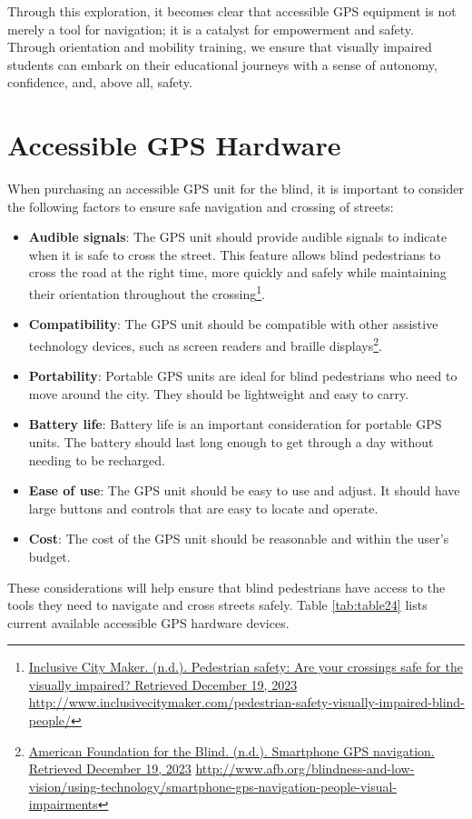 \documentclass[12pt,letterpaper,twoside,openright]{report}
\begin{document}
Through this exploration, it becomes clear that accessible GPS equipment is not merely a tool for navigation; it is a catalyst for empowerment and safety. Through orientation and mobility training, we ensure that visually impaired students can embark on their educational journeys with a sense of autonomy, confidence, and, above all, safety.


\pagebreak \hypertarget{accessible-gps-mapping-hardware}{}\section{Accessible GPS Hardware}\label{accessible-gps-mapping-hardware}
When purchasing an accessible GPS unit for the blind, it is important to consider the following factors to ensure safe navigation and crossing of streets:
\begin{itemize}[leftmargin=*]
\item \textbf{Audible signals}: The GPS unit should provide audible signals to indicate when it is safe to cross the street. This feature allows blind pedestrians to cross the road at the right time, more quickly and safely while maintaining their orientation throughout the crossing\footnote{\raggedright \href{http://www.inclusivecitymaker.com/pedestrian-safety-visually-impaired-blind-people/}{Inclusive City Maker. (n.d.). Pedestrian safety: Are your crossings safe for the visually impaired? Retrieved December 19, 2023} \url{http://www.inclusivecitymaker.com/pedestrian-safety-visually-impaired-blind-people/}}.
\item \textbf{Compatibility}: The GPS unit should be compatible with other assistive technology devices, such as screen readers and braille displays\footnote{\raggedright \href{http://www.afb.org/blindness-and-low-vision/using-technology/smartphone-gps-navigation-people-visual-impairments}{American Foundation for the Blind. (n.d.). Smartphone GPS navigation. Retrieved December 19, 2023} \url{http://www.afb.org/blindness-and-low-vision/using-technology/smartphone-gps-navigation-people-visual-impairments}}.
\item \textbf{Portability}: Portable GPS units are ideal for blind pedestrians who need to move around the city. They should be lightweight and easy to carry.
\item \textbf{Battery life}: Battery life is an important consideration for portable GPS units. The battery should last long enough to get through a day without needing to be recharged.
\item \textbf{Ease of use}: The GPS unit should be easy to use and adjust. It should have large buttons and controls that are easy to locate and operate.
\item \textbf{Cost}: The cost of the GPS unit should be reasonable and within the user’s budget.
\end{itemize}
These considerations will help ensure that blind pedestrians have access to the tools they need to navigate and cross streets safely. Table \ref{tab:table24} lists current available accessible GPS hardware devices.
\end{document}
